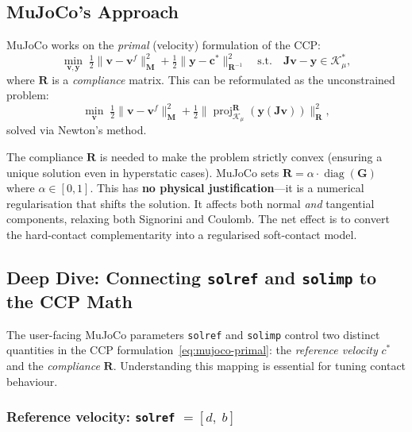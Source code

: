 \documentclass[11pt,twoside]{report}
\theoremstyle{definition}
\theoremstyle{plain}
\theoremstyle{remark}
\newcommand{\0}{\bm{0}}
\newcommand{\M}{\bm{M}}
\newcommand{\J}{\bm{J}}
\newcommand{\Kc}{\mathcal{K}}
\DeclareMathOperator{\diag}{diag}
\DeclareMathOperator{\proj}{proj}
\begin{document}
\subsection{MuJoCo's Approach}
\label{sec:mujoco-contact}

MuJoCo works on the \emph{primal} (velocity) formulation of the CCP:
\begin{equation}\label{eq:mujoco-primal}
\min_{\bm{v},\bm{y}}\;\tfrac12\|\bm{v}-\bm{v}^{f}\|_{\M}^{2}
+\tfrac12\|\bm{y}-\bm{c}^{*}\|_{\bm{R}^{-1}}^{2}
\quad\text{s.t.}\quad\J\bm{v}-\bm{y}\in\Kc_{\mu}^{*},
\end{equation}
where $\bm{R}$ is a \emph{compliance} matrix.  This can be reformulated
as the unconstrained problem:
\begin{equation}\label{eq:mujoco-unconst}
\min_{\bm{v}}\;\tfrac12\|\bm{v}-\bm{v}^{f}\|_{\M}^{2}
+\tfrac12\|\proj_{\Kc_{\mu}}^{\bm{R}}(\bm{y}(\J\bm{v}))\|_{\bm{R}}^{2},
\end{equation}
solved via Newton's method.

\begin{warningbox}
The compliance $\bm{R}$ is needed to make the problem strictly convex
(ensuring a unique solution even in hyperstatic cases).
MuJoCo sets $\bm{R}=\alpha\cdot\diag(\bm{G})$ where $\alpha\in[0,1]$.
This has \textbf{no physical justification}---it is a numerical
regularisation that shifts the solution.
It affects both normal \emph{and} tangential components, relaxing
both Signorini and Coulomb.
The net effect is to convert the hard-contact complementarity into
a regularised soft-contact model.
\end{warningbox}

\subsection{Deep Dive: Connecting \texttt{solref} and \texttt{solimp} to the CCP Math}
\label{sec:solref-solimp}

The user-facing MuJoCo parameters \texttt{solref} and \texttt{solimp} control
two distinct quantities in the CCP formulation~\eqref{eq:mujoco-primal}:
the \emph{reference velocity} $c^{*}$ and the \emph{compliance} $\bm{R}$.
Understanding this mapping is essential for tuning contact behaviour.

\subsubsection{Reference velocity: \texttt{solref} $=[d,\;b]$}
\end{document}
